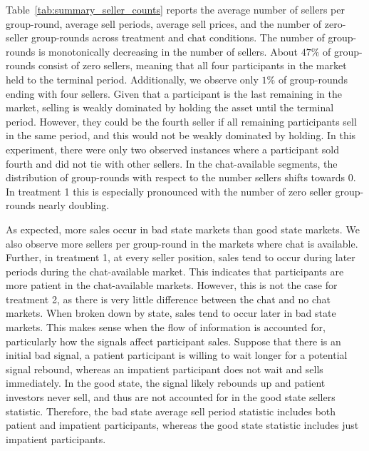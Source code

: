 \documentclass[thesis]{uathesis}
\begin{document}
\begin{body}
Table~\ref{tab:summary_seller_counts} reports the average number of sellers per group-round, average sell periods, average sell prices, and the number of zero-seller group-rounds across treatment and chat conditions. The number of group-rounds is monotonically decreasing in the number of sellers. About $47\%$ of group-rounds consist of zero sellers, meaning that all four participants in the market held to the terminal period. Additionally, we observe only $1\%$ of group-rounds ending with four sellers. Given that a participant is the last remaining in the market, selling is weakly dominated by holding the asset until the terminal period. However, they could be the fourth seller if all remaining participants sell in the same period, and this would not be weakly dominated by holding. In this experiment, there were only two observed instances where a participant sold fourth and did not tie with other sellers. In the chat-available segments, the distribution of group-rounds with respect to the number sellers shifts towards 0. In treatment 1 this is especially pronounced with the number of zero seller group-rounds nearly doubling.

As expected, more sales occur in bad state markets than good state markets. We also observe more sellers per group-round in the markets where chat is available. Further, in treatment 1, at every seller position, sales tend to occur during later periods during the chat-available market. This indicates that participants are more patient in the chat-available markets. However, this is not the case for treatment 2, as there is very little difference between the chat and no chat markets. When broken down by state, sales tend to occur later in bad state markets. This makes sense when the flow of information is accounted for, particularly how the signals affect participant sales. Suppose that there is an initial bad signal, a patient participant is willing to wait longer for a potential signal rebound, whereas an impatient participant does not wait and sells immediately. In the good state, the signal likely rebounds up and patient investors never sell, and thus are not accounted for in the good state sellers statistic. Therefore, the bad state average sell period statistic includes both patient and impatient participants, whereas the good state statistic includes just impatient participants.

\begin{table}[H]
  \centering
  \caption{Subject pool demographics and personality traits}
  \label{tab:summary_demographics_traits}
  
\end{table}


\end{body}
\end{document}
